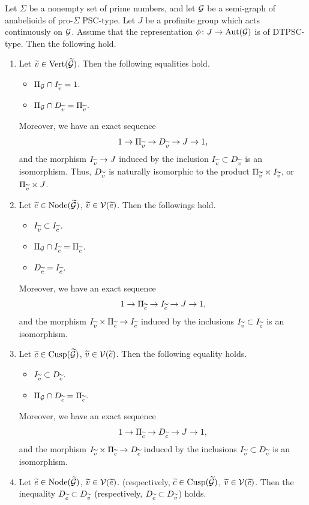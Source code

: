 \begin{lem}\label{BasicPropertiesOfDecompositionAndInertiaSubgroups}
  Let $\Sigma$ be a nonempty set of prime numbers, and let $\mathcal{G}$ be a semi-graph of anabelioids of pro-$\Sigma$ PSC-type. Let $J$ be a profinite group which acts continuously on $\mathcal{G}$. Assume that the representation $\phi \colon J \to \mathrm{Aut}(\mathcal{G})$ is of DTPSC-type. Then the following hold.
  \begin{enumerate}
    \item Let $\widetilde{v} \in \mathrm{Vert}(\widetilde{\mathcal{G}})$. Then the following equalities hold.
    \begin{itemize}
      \item $\Pi_{\mathcal{G}} \cap I_{\widetilde{v}} = 1$.
      \item $\Pi_{\mathcal{G}} \cap D_{\widetilde{v}} = \Pi_{\widetilde{v}}$.
    \end{itemize}
    Moreover, we have an exact sequence
    \[
      1 \to \Pi_{\widetilde{v}} \to D_{\widetilde{v}} \to J \to 1,
    \]
    and the morphism $I_{\widetilde{v}} \to J$ induced by the inclusion $I_{\widetilde{v}} \subset D_{\widetilde{v}}$ is an isomorphism. Thus, $D_{\widetilde{v}}$ is naturally isomorphic to the product $\Pi_{\widetilde{v}} \times I_{\widetilde{v}}$, or $\Pi_{\widetilde{v}} \times J$.
    \item Let $\widetilde{e} \in \mathrm{Node}(\widetilde{\mathcal{G}})$, $\widetilde{v} \in \mathcal{V}(\widetilde{e})$. Then the followings hold.
    \begin{itemize}
      \item $I_{\widetilde{v}} \subset I_{\widetilde{e}}$.
      \item $\Pi_{\mathcal{G}} \cap I_{\widetilde{e}} = \Pi_{\widetilde{e}}$.
      \item $D_{\widetilde{e}} = I_{\widetilde{e}}$.
    \end{itemize}
    Moreover, we have an exact sequence
    \[
      1 \to \Pi_{\widetilde{e}} \to I_{\widetilde{e}} \to J \to 1,
    \]  
    and the morphism $I_{\widetilde{v}} \times \Pi_{\widetilde{e}} \to I_{\widetilde{e}}$ induced by the inclusions $I_{\widetilde{v}} \subset I_{\widetilde{e}}$ is an isomorphism.
    \item Let $\widetilde{c} \in \mathrm{Cusp}(\widetilde{\mathcal{G}})$, $\widetilde{v} \in \mathcal{V}(\widetilde{c})$. Then the following equality holds.
    \begin{itemize}
      \item $I_{\widetilde{v}} \subset D_{\widetilde{c}}$.
      \item $\Pi_{\mathcal{G}} \cap D_{\widetilde{c}} = \Pi_{\widetilde{c}}$.
    \end{itemize}
    Moreover, we have an exact sequence
    \[
      1 \to \Pi_{\widetilde{c}} \to D_{\widetilde{c}} \to J \to 1,
    \]
    and the morphism $I_{\widetilde{v}} \times \Pi_{\widetilde{c}} \to D_{\widetilde{c}}$ induced by the inclusions $I_{\widetilde{v}} \subset D_{\widetilde{c}}$ is an isomorphism.
    \item Let $\widetilde{e} \in \mathrm{Node}(\widetilde{\mathcal{G}})$, $\widetilde{v} \in \mathcal{V}(\widetilde{e})$. (respectively, $\widetilde{c} \in \mathrm{Cusp}(\widetilde{\mathcal{G}})$, $\widetilde{v} \in \mathcal{V}(\widetilde{c})$. Then the inequality $D_{\widetilde{e}} \subset D_{\widetilde{v}}$ (respectively, $D_{\widetilde{c}} \subset D_{\widetilde{v}}$) holds.
  \end{enumerate}
\end{lem}
